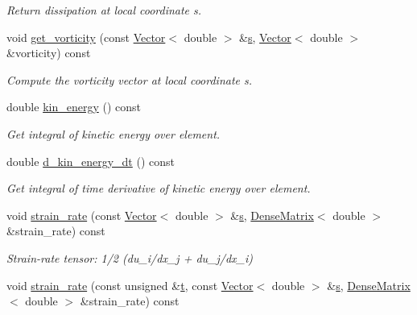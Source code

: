 \begin{DoxyCompactItemize}
\begin{DoxyCompactList}\small\item\em Return dissipation at local coordinate s. \end{DoxyCompactList}\item 
void \hyperlink{classoomph_1_1GeneralisedNewtonianNavierStokesEquations_a85033235e0c4b2ce0b4ac00d8223d7cc}{get\+\_\+vorticity} (const \hyperlink{classoomph_1_1Vector}{Vector}$<$ double $>$ \&\hyperlink{cfortran_8h_ab7123126e4885ef647dd9c6e3807a21c}{s}, \hyperlink{classoomph_1_1Vector}{Vector}$<$ double $>$ \&vorticity) const
\begin{DoxyCompactList}\small\item\em Compute the vorticity vector at local coordinate s. \end{DoxyCompactList}\item 
double \hyperlink{classoomph_1_1GeneralisedNewtonianNavierStokesEquations_acd047d8c839e7145fa54f862f8642fd9}{kin\+\_\+energy} () const
\begin{DoxyCompactList}\small\item\em Get integral of kinetic energy over element. \end{DoxyCompactList}\item 
double \hyperlink{classoomph_1_1GeneralisedNewtonianNavierStokesEquations_a8e8178ed41b5e4db3bf8f6d028cb0c43}{d\+\_\+kin\+\_\+energy\+\_\+dt} () const
\begin{DoxyCompactList}\small\item\em Get integral of time derivative of kinetic energy over element. \end{DoxyCompactList}\item 
void \hyperlink{classoomph_1_1GeneralisedNewtonianNavierStokesEquations_a2ea3e797f3c7aceb7e3f12188746818c}{strain\+\_\+rate} (const \hyperlink{classoomph_1_1Vector}{Vector}$<$ double $>$ \&\hyperlink{cfortran_8h_ab7123126e4885ef647dd9c6e3807a21c}{s}, \hyperlink{classoomph_1_1DenseMatrix}{Dense\+Matrix}$<$ double $>$ \&strain\+\_\+rate) const
\begin{DoxyCompactList}\small\item\em Strain-\/rate tensor\+: 1/2 (du\+\_\+i/dx\+\_\+j + du\+\_\+j/dx\+\_\+i) \end{DoxyCompactList}\item 
void \hyperlink{classoomph_1_1GeneralisedNewtonianNavierStokesEquations_a247f93de4ca4a4c5e9856fbfa7be8c48}{strain\+\_\+rate} (const unsigned \&\hyperlink{cfortran_8h_af6f0bd3dc13317f895c91323c25c2b8f}{t}, const \hyperlink{classoomph_1_1Vector}{Vector}$<$ double $>$ \&\hyperlink{cfortran_8h_ab7123126e4885ef647dd9c6e3807a21c}{s}, \hyperlink{classoomph_1_1DenseMatrix}{Dense\+Matrix}$<$ double $>$ \&strain\+\_\+rate) const

\end{DoxyCompactItemize}
